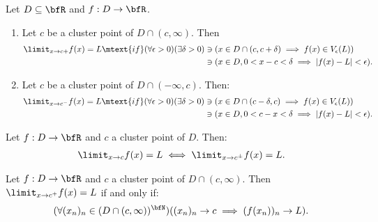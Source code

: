    \begin{definition}
        Let $D \subseteq \bfR$ and $f:D \rightarrow \bfR$.
            \begin{enumerate}[label = (\arabic*)]
                \item Let $c$ be a cluster point of $D \cap (c,\infty)$. Then
                    \begin{equation*}
                    \begin{split}
                        \limit_{x \rightarrow c+}f(x) = L \mtext{if} (\forall \epsilon>0)(\exists \delta > 0)&\ni (x \in D \cap (c,c+\delta) \implies f(x) \in V_\epsilon(L)) \\
                        & \ni (x \in D,0 < x-c < \delta \implies |f(x) - L| < \epsilon).
                    \end{split}
                    \end{equation*}
                
                \item Let $c$ be a cluster point of $D \cap (-\infty,c)$. Then:
                    \begin{equation*}
                    \begin{split}
                        \limit_{x \rightarrow c^{-}}f(x) = L \mtext{if} (\forall \epsilon > 0)(\exists \delta > 0)&\ni (x \in D \cap (c-\delta,c) \implies f(x) \in V_\epsilon(L)) \\
                        &\ni (x \in D, 0 < c - x< \delta \implies |f(x) - L| < \epsilon).
                    \end{split}
                    \end{equation*}
            \end{enumerate}
    \end{definition}

    \begin{proposition}
        Let $f:D \rightarrow \bfR$ and $c$ a cluster point of $D$. Then:
            \begin{equation*}
            \begin{split}
                \limit_{x \rightarrow c}f(x) = L \iff \limit_{x \rightarrow c^{\pm}}f(x) = L.
            \end{split}
            \end{equation*}
    \end{proposition}

    \begin{proposition}
        Let $f:D \rightarrow \bfR$ and $c$ a cluster point of $D \cap (c,\infty)$. Then $\limit_{x \rightarrow c^+}f(x) = L$ if and only if:
            \begin{equation*}
            \begin{split}
                (\forall (x_n)_n \in (D \cap (c,\infty))^\bfN)((x_n)_n \rightarrow c \implies (f(x_n))_n \rightarrow L).
            \end{split}
            \end{equation*}
    \end{proposition} 


